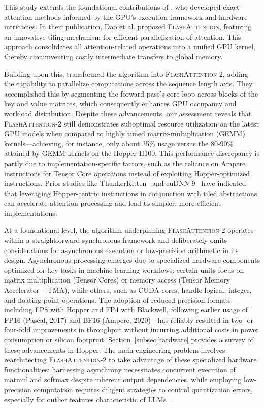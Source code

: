 This study extends the foundational contributions of \citet{dao2022flashattention}, who developed exact-attention methods informed by the GPU's execution framework and hardware intricacies. In their publication, Dao et al. proposed \textsc{FlashAttention}, featuring an innovative tiling mechanism for efficient parallelization of attention. This approach consolidates all attention-related operations into a unified GPU kernel, thereby circumventing costly intermediate transfers to global memory. 

Building upon this, \citet{dao2023flashattention2} transformed the algorithm into \textsc{FlashAttention-2}, adding the capability to parallelize computations across the sequence length axis. They accomplished this by segmenting the forward pass’s core loop across blocks of the key and value matrices, which consequently enhances GPU occupancy and workload distribution. Despite these advancements, our assessment reveals that \textsc{FlashAttention-2} still demonstrates suboptimal resource utilization on the latest GPU models when compared to highly tuned matrix-multiplication (GEMM) kernels—achieving, for instance, only about 35\% usage versus the 80-90\% attained by GEMM kernels on the Hopper H100. This performance discrepancy is partly due to implementation-specific factors, such as the reliance on Ampere instructions for Tensor Core operations instead of exploiting Hopper-optimized instructions. Prior studies like ThunkerKitten~\citep{spector2024thunder} and cuDNN 9~\citep{cudnn9} have indicated that leveraging Hopper-centric instructions in conjunction with tiled abstractions can accelerate attention processing and lead to simpler, more efficient implementations.

At a foundational level, the algorithm underpinning \textsc{FlashAttention-2} operates within a straightforward synchronous framework and deliberately omits considerations for asynchronous execution or low-precision arithmetic in its design. Asynchronous processing emerges due to specialized hardware components optimized for key tasks in machine learning workflows: certain units focus on matrix multiplication (Tensor Cores) or memory access (Tensor Memory Accelerator -- TMA), while others, such as CUDA cores, handle logical, integer, and floating-point operations. The adoption of reduced precision formats—including FP8 with Hopper and FP4 with Blackwell, following earlier usage of FP16 (Pascal, 2017) and BF16 (Ampere, 2020)—has reliably resulted in two- or four-fold improvements in throughput without incurring additional costs in power consumption or silicon footprint. Section~\cref{subsec:hardware} provides a survey of these advancements in Hopper. The main engineering problem involves rearchitecting \textsc{FlashAttention-2} to take advantage of these specialized hardware functionalities: harnessing asynchrony necessitates concurrent execution of matmul and softmax despite inherent output dependencies, while employing low-precision computation requires diligent strategies to control quantization errors, especially for outlier features characteristic of LLMs~\citep{dettmers2208llm, sun2024massive}.

